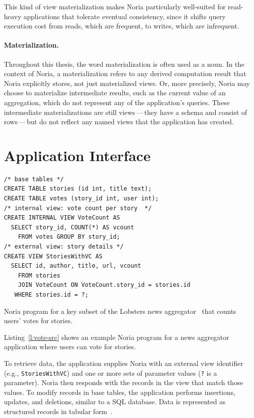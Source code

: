 This kind of view materialization makes Noria particularly well-suited for
read-heavy applications that tolerate eventual consistency, since it shifts
query execution cost from reads, which are frequent, to writes, which are
infrequent.

\paragraph{Materialization.}
Throughout this thesis, the word materialization is often used as a noun. In the
context of Noria, a materialization refers to any derived computation result
that Noria explicitly stores, not just materialized views. Or, more precisely,
Noria may choose to materialize intermediate results, such as the current value
of an aggregation, which do not represent any of the application's queries.
These intermediate materializations are still views\,---\,they have a schema and
consist of rows\,---\,but do not reflect any named views that the application
has created.

\section{Application Interface}

\begin{listing}[h]
  \begin{verbatim}
/* base tables */
CREATE TABLE stories (id int, title text);
CREATE TABLE votes (story_id int, user int);
/* internal view: vote count per story  */
CREATE INTERNAL VIEW VoteCount AS
  SELECT story_id, COUNT(*) AS vcount
    FROM votes GROUP BY story_id;
/* external view: story details */
CREATE VIEW StoriesWithVC AS
  SELECT id, author, title, url, vcount
    FROM stories
    JOIN VoteCount ON VoteCount.story_id = stories.id
   WHERE stories.id = ?;
  \end{verbatim}
  \caption{Noria program for a key subset of the Lobsters news
           aggregator~\cite{lobsters} that counts users' votes for stories.}
  \label{l:vote-src}
\end{listing}

Listing~\vref{l:vote-src} shows an example Noria program for a news aggregator
application where users can vote for stories.

To retrieve data, the application supplies Noria with an external view
identifier (e.g., \texttt{StoriesWithVC}) and one or more sets of parameter
values (\texttt{?} is a parameter). Noria then responds with the records in the view that match those
values. To modify records in base tables, the application performs insertions,
updates, and deletions, similar to a SQL database. Data is represented as
structured records in tabular form~\cite{spanner, bigtable}.

